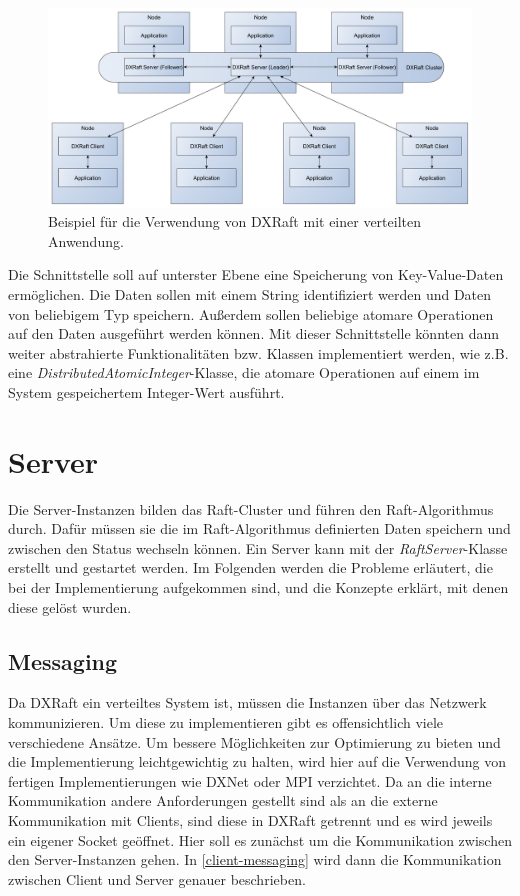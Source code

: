 \begin{figure}[h]
	\centering
	\includegraphics[width=\linewidth]{img/components.pdf}
	\caption{Beispiel für die Verwendung von DXRaft mit einer verteilten Anwendung.}
	\label{fig:components}
\end{figure}

Die Schnittstelle soll auf unterster Ebene eine Speicherung von Key-Value-Daten ermöglichen. Die Daten sollen mit einem String identifiziert werden und Daten von beliebigem Typ speichern. Außerdem sollen beliebige atomare Operationen auf den Daten ausgeführt werden können. Mit dieser Schnittstelle könnten dann weiter abstrahierte Funktionalitäten bzw. Klassen implementiert werden, wie z.B. eine \textit{DistributedAtomicInteger}-Klasse, die atomare Operationen auf einem im System gespeichertem Integer-Wert ausführt.

\section{Server}

Die Server-Instanzen bilden das Raft-Cluster und führen den Raft-Algorithmus durch. Dafür müssen sie die im Raft-Algorithmus definierten Daten speichern und zwischen den Status wechseln können. Ein Server kann mit der \textit{RaftServer}-Klasse erstellt und gestartet werden. Im Folgenden werden die Probleme erläutert, die bei der Implementierung aufgekommen sind, und die Konzepte erklärt, mit denen diese gelöst wurden.

\subsection{Messaging}
\label{messaging}

Da DXRaft ein verteiltes System ist, müssen die Instanzen über das Netzwerk kommunizieren. Um diese zu implementieren gibt es offensichtlich viele verschiedene Ansätze. Um bessere Möglichkeiten zur Optimierung zu bieten und die Implementierung leichtgewichtig zu halten, wird hier auf die Verwendung von fertigen Implementierungen wie DXNet  \cite{dxnet} oder MPI \cite{mpi} verzichtet. Da an die interne Kommunikation andere Anforderungen gestellt sind als an die externe Kommunikation mit Clients, sind diese in DXRaft getrennt und es wird jeweils ein eigener Socket geöffnet. Hier soll es zunächst um die Kommunikation zwischen den Server-Instanzen gehen. In \ref{client-messaging} wird dann die Kommunikation zwischen Client und Server genauer beschrieben.

